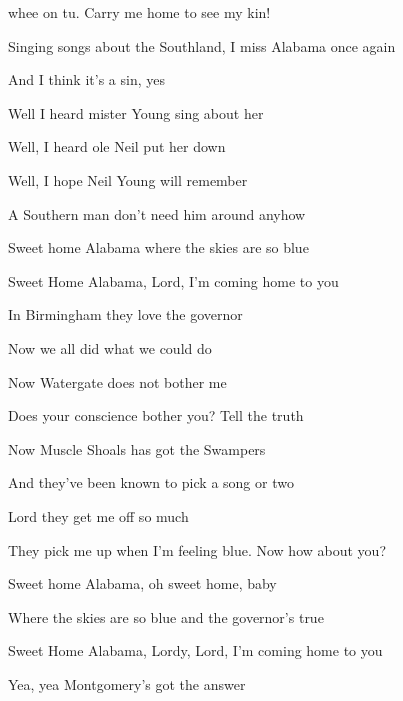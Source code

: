 

\zs
{} whee on tu.
Carry me home to see my kin!

Singing songs about the Southland,
I miss Alabama once again

And I think it's a sin, yes
\ks

\zs
Well I heard mister Young sing about her

Well, I heard ole Neil put her down

Well, I hope Neil Young will remember

A Southern man don't need him around anyhow
\ks

\zr
Sweet home Alabama
where the skies are so blue

Sweet Home Alabama,
Lord, I'm coming home to you
\kr

\zs
In Birmingham they love the governor

Now we all did what we could do

Now Watergate does not bother me

Does your conscience bother you?
Tell the truth
\ks

\zr  \kr

\zs
Now Muscle Shoals has got the Swampers

And they've been known to pick a song or two

Lord they get me off so much

They pick me up when I'm feeling blue.
Now how about you?
\ks

\zr  \kr

\zr
Sweet home Alabama,
oh sweet home, baby

Where the skies are so blue
and the governor's true
\kr

\zr
Sweet Home Alabama, Lordy, Lord, I'm coming home to you

Yea, yea Montgomery's got the answer
\kr

\kp
